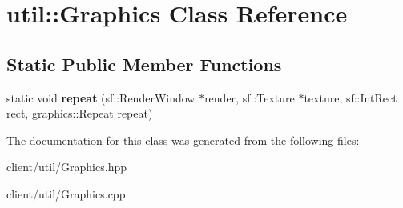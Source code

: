 \hypertarget{classutil_1_1_graphics}{\section{util\-:\-:Graphics Class Reference}
\label{classutil_1_1_graphics}
}
\subsection*{Static Public Member Functions}
\begin{DoxyCompactItemize}
\item 
\hypertarget{classutil_1_1_graphics_a168783a5be0e9aadff71b18417e40db0}{static void {\bfseries repeat} (sf\-::\-Render\-Window $\ast$render, sf\-::\-Texture $\ast$texture, sf\-::\-Int\-Rect rect, graphics\-::\-Repeat repeat)}\label{classutil_1_1_graphics_a168783a5be0e9aadff71b18417e40db0}

\end{DoxyCompactItemize}


The documentation for this class was generated from the following files\-:\begin{DoxyCompactItemize}
\item 
client/util/Graphics.\-hpp\item 
client/util/Graphics.\-cpp\end{DoxyCompactItemize}
